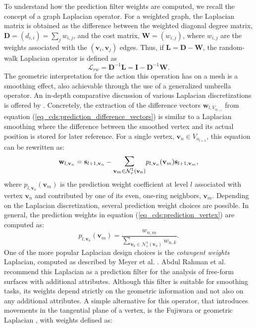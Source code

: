 \documentclass[graybox]{svmult}
\begin{document}
To understand how the prediction filter weights are computed, we recall the concept of a graph Laplacian operator. For a weighted graph, the Laplacian matrix is obtained as the difference between the weighted diagonal degree matrix, $\mathbf{D} = (d_{i,i}) = \sum_{j}{w_{i,j}}$, and the cost matrix, $\mathbf{W} = (w_{i,j})$,
where $w_{i,j}$ are the weights associated with the $(\mathbf{v}_i,\mathbf{v}_j)$ edges. Thus, if $\mathbf{L} = \mathbf{D} -  \mathbf{W}$, the random-walk Laplacian operator is defined as
\begin{equation}
\mathcal{L}_{rw} = \mathbf{D}^{-1} \mathbf{L} =  \mathbf{I} - \mathbf{D}^{-1} \mathbf{W}.
\label{eq_cds:random_walk_laplacian}
\end{equation}
The geometric interpretation for the action this operation has on a mesh is a smoothing effect, also achievable through the use of a generalized umbrella operator.  An in-depth comparative discussion of various Laplacian discretizations  is offered by \cite{Wardetzky2007}. Concretely, the extraction of the difference vectors $\mathbf{w}_{l,V_{o_{l+1}}}$ from equation (\ref{eq_cds:prediction_difference_vectors}) is similar to a Laplacian smoothing where
the difference between the smoothed vertex and its actual position is stored for later reference. For a single vertex, $\mathbf{v}_n \in V_{o_{l+1}}$, this equation can be rewritten as:
\begin{equation}
\mathbf{w}_{l, \mathbf{v}_n} = \mathbf{s}_{l+1,\mathbf{v}_n} - \mathlarger{\mathlarger{\sum}}_{\mathbf{v}_m \in \mathcal{N}_v^1(\mathbf{v}_n)}{ p_{l, \mathbf{v}_n}(\mathbf{v}_m)  \mathbf{s}_{l+1,\mathbf{v}_m} },
\label{eq_cds:prediction_vertex}
\end{equation}
where $p_{l, \mathbf{v}_n}(\mathbf{v}_m)$ is the prediction weight coefficient at level $l$ associated with vertex $\mathbf{v}_n$ and contributed by one of its even, one-ring neighbors, $\mathbf{v}_m$. Depending on the Laplacian discretization, several prediction weight choices are possible. In general, the prediction weights in equation (\ref{eq_cds:prediction_vertex}) are computed as:
\begin{equation}
p_{l, \mathbf{v}_n}(\mathbf{v}_m) = \frac{ w_{n,m} } { \sum_{\mathbf{v}_k \in \mathcal{N}_v^1(\mathbf{v}_n)} { w_{n,k } }}.
\label{eq_cds:prediction_weight}
\end{equation}
One of the more popular Laplacian design choices is the \emph{cotangent weights} Laplacian, computed as described by Meyer et al. \cite{Meyer2003}. Abdul Rahman et al. \cite{AbdulRahman2013} recommend this Laplacian as a prediction filter for the analysis of free-form surfaces with additional attributes. Although this filter is suitable for smoothing tasks, its weights depend strictly on the geometric information and not also on any additional attributes. A simple alternative for this operator, that introduces movements in the tangential plane of a vertex, is the Fujiwara or geometric Laplacian \cite{Fujiwara95}, with weights defined as:
\end{document}
